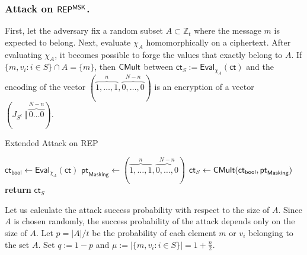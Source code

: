 \documentclass[runningheads]{llncs}
\newcommand{\bb}[1]{\mathbb{#1}}  %
\newcommand{\ct}{\textsf{ct}{}}
\newcommand{\eval}{\textsf{Eval}}
\newcommand{\REP}{\textsf{REP}{}}
\begin{document}
        \subsubsection{Attack on $\REP^{\sf MSK}$.} \label{subsec:3.3 Extended Attack}
        First, let the adversary fix a random subset $A\subset \bb Z_t$ where the message $m$ is expected to belong. 
        Next, evaluate $\chi_A$ homomorphically on a ciphertext.
        After evaluating $\chi_A$, it becomes possible to forge the values that exactly belong to $A$.
        If $\{m,v_i:i\in S\}\cap A = \{m\}$, then ${\sf CMult}$ between $\ct_S:=\eval_{\chi_A}(\ct)$ and the encoding of the vector $(\overbrace{1,\dots,1}^{n},\overbrace{0,\dots,0}^{N-n})$ is an encryption of a vector $(J_{S^c}\,\Vert\,\overbrace{0\dots0}^{N-n})$.
        
            \begin{algorithm}
                    \caption{Extended Attack on \REP}
                    \label{alg: probabilistic attack on rep}
                    \begin{algorithmic}[1]
                        \Procedure{$\mathsf{Extended\_Attack}$}{$\ct, A$}
                            \State $\ct_{\textsf{bool}}\gets \textsf{Eval}_{\chi_A}(\ct)$
                            \State $\mathsf{pt}_{\textsf{Masking}}\gets (\overbrace{1,\dots,1}^{n},\overbrace{0,\dots,0}^{N-n})$
                            \State $\ct_{S}\gets\textsf{CMult}(\ct_{\sf bool},\mathsf{pt}_{\sf Masking})$ 
                            \State \textbf{return} $\ct_{S}$
                        \EndProcedure
                    \end{algorithmic}
            \end{algorithm}
            
        Let us calculate the attack success probability with respect to the size of $A$. 
        Since $A$ is chosen randomly, the success probability of the attack depends only on the size of $A$. 
        Let $p=|A|/{t}$ be the probability of each element $m$ or $v_i$ belonging to the set $A$. 
        Set $q := 1 - p$ and $\mu:=\left|\{m,v_i:i\in S\}\right|=1+\frac{n}{2}$. 
\end{document}
